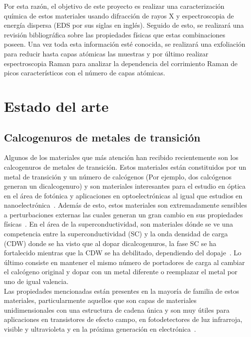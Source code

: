 \documentclass{article}
\begin{document}
Por esta razón, el objetivo de este proyecto es realizar una caracterización química de estos materiales usando difracción de rayos X y espectroscopia de energía dispersa (EDS por sus siglas en inglés). Seguido de esto, se realizará una revisión bibliográfica sobre las propiedades físicas que estas combinaciones poseen. Una vez toda esta información esté conocida, se realizará una exfoliación para reducir hasta capas atómicas las muestras y por último realizar espectroscopia Raman para analizar la dependencia del corrimiento Raman de picos característicos con el número de capas atómicas.

\section{Estado del arte}
\subsection{Calcogenuros de metales de transición}

Algunos de los materiales que más atención han recibido recientemente son los calcogenuros de metales de transición. Estos materiales están constituidos por un metal de transición y un número de calcógenos (Por ejemplo, dos calcógenos generan un dicalcogenuro) y son materiales interesantes para el estudio en óptica en el área de fotónica y aplicaciones en optoelectrónicas al igual que estudios en nanoelectrónica~\cite{dical}. Además de esto, estos materiales son extremadamente sensibles a perturbaciones externas las cuales generan un gran cambio en sus propiedades físicas~\cite{dical}. En el área de la superconductividad, son materiales dónde se ve una competencia entre la superconductividad (SC) y la onda densidad de carga (CDW) donde se ha visto que al dopar dicalcogenuros, la fase SC se ha fortalecido mientras que la CDW se ha debilitado, dependiendo del dopaje~\cite{Competition1}. Lo último consiste en mantener el mismo número de portadores de carga al cambiar el calcógeno original y dopar con un metal diferente o reemplazar el metal por uno de igual valencia.\\

Las propiedades mencionadas están presentes en la mayoría de familia de estos materiales, particularmente aquellos que son capas de materiales unidimensionales con una estructura de cadena única y son muy útiles para aplicaciones en transistores de efecto campo, en fotodetectores de luz infrarroja, visible y ultravioleta y en la próxima generación en electrónica~\cite{trical}.
\end{document}
